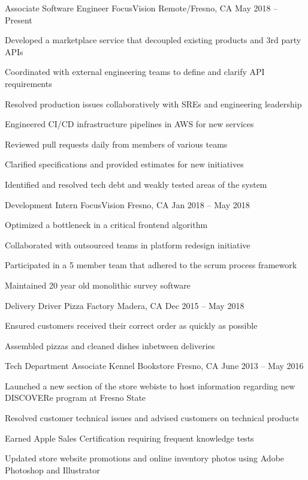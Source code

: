 \documentclass[]{awesome-cv}
\begin{document}
\vspace{-2mm}
\begin{cventries}
	\cventry
	{Associate Software Engineer}
	{FocusVision}
	{Remote/Fresno, CA}
	{May 2018 – Present}
	{\begin{cvitems}
		\item {Developed a marketplace service that decoupled existing products and 3rd party APIs}
		\item {Coordinated with external engineering teams to define and clarify API requirements}
		\item {Resolved production issues collaboratively with SREs and engineering leadership}
		\item {Engineered CI/CD infrastructure pipelines in AWS for new services}
		\item {Reviewed pull requests daily from members of various teams}
		\item {Clarified specifications and provided estimates for new initiatives}
		\item {Identified and resolved tech debt and weakly tested areas of the system}
		\end{cvitems}}
	\cventry
	{Development Intern}
	{FocusVision}
	{Fresno, CA}
	{Jan 2018 – May 2018}
	{\begin{cvitems}
		\item {Optimized a bottleneck in a critical frontend algorithm}
		\item {Collaborated with outsourced teams in platform redesign initiative}
		\item {Participated in a 5 member team that adhered to the scrum process framework}
		\item {Maintained 20 year old monolithic survey software}
		\end{cvitems}}
	\cventry
	{Delivery Driver}
	{Pizza Factory}
	{Madera, CA}
	{Dec 2015 – May 2018}
	{\begin{cvitems}
		\item {Ensured customers received their correct order as quickly as possible}
		\item {Assembled pizzas and cleaned dishes inbetween deliveries}
		\end{cvitems}}
	\cventry
	{Tech Department Associate}
	{Kennel Bookstore}
	{Fresno, CA}
	{June 2013 – May 2016}
	{\begin{cvitems}
		\item {Launched a new section of the store webiste to host information regarding new DISCOVERe program at Fresno State}
		\item {Resolved customer technical issues and advised customers on technical products}
		\item {Earned Apple Sales Certification requiring frequent knowledge tests}
		\item {Updated store website promotions and online inventory photos using Adobe Photoshop and Illustrator}
		\end{cvitems}}
\end{cventries}
\end{document}
